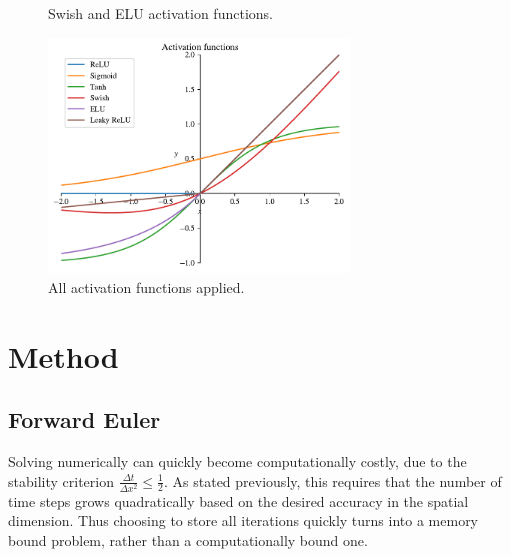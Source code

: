 \documentclass{article}
\theoremstyle{definition}
\begin{document}
\begin{figure}[H]%
    \centering
    \qquad
    \caption{Swish and ELU activation functions.}%
    \label{fig:swish}%
\end{figure}

\begin{figure}[H]%
    \centering
    \includegraphics[width=8cm]{Project3/figures/activators/activators.pdf}%
    \caption{All activation functions applied.}%
    \label{fig:activation}%
\end{figure}

\newpage
\section{Method}
\subsection{Forward Euler}
Solving numerically can quickly become computationally costly, due to the stability criterion $\frac{\Delta t}{\Delta x^2} \leq \frac{1}{2}$. As stated previously, this requires that the number of time steps grows quadratically based on the desired accuracy in the spatial dimension. Thus choosing to store all iterations quickly turns into a memory bound problem, rather than a computationally bound one.
\end{document}
